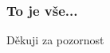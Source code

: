 \documentclass{beamer}
\begin{document}
	\begin{frame}
    \frametitle{To je vše...}
		
		\begin{center}
			\Large{Děkuji za pozornost}
		\end{center}
	\end{frame}
\end{document}

